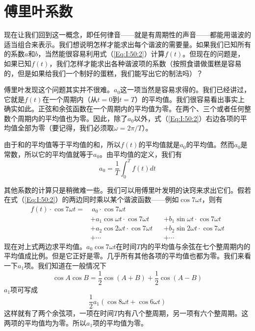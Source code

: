 \section{傅里叶系数}

现在让我们回到这一概念，即任何律音——就是有周期性的声音——都能用谐波的适当组合来表示。我们想说明怎样才能求出每个谐波的需要量。如果我们已知所有的系数$a$和$b$，当然能很容易利用式（\ref{Eq:I:50:2}）计算$f(t)$。但现在的问题是，如果已知$f(t)$，我们怎样才能求出各种谐波项的系数（按照食谱做蛋糕是容易的，但是如果给我们一个制好的蛋糕，我们能写出它的制法吗）？

傅里叶发现这个问题其实并不很难。$a_0$这一项当然是容易求得的。我们已经讲过，它就是$f(t)$在一个周期内（从$t=0$到$t=T$）的平均值。我们很容易看出事实上确实如此。正弦和余弦函数在一个周期内的平均值为零。在两个、三个或者任何整数个周期内的平均值也为零。因此，除了$a_0$以外，式（\ref{Eq:I:50:2}）右边各项的平均值全部为零（要记得，我们必须取$\omega=2\pi/T$）。

由于和的平均值等于平均值的和，所以$f(t)$的平均值就是$a_0$的平均值。然而$a_0$是常数，所以它的平均值就等于$a_0$。由平均值的定义，我们有
\begin{equation}
    \label{Eq:I:50:3}
    a_0 = \frac{1}{T}\int_0^T f(t)dt
\end{equation}

其他系数的计算只是稍微难一些。我们可以用傅里叶发明的诀窍来求出它们。假若在式（\ref{Eq:I:50:2}）的两边同时乘以某个谐波函数——例如$\cos7\omega t$，则有
\begin{equation}
    \label{Eq:I:50:4}
    \begin{aligned}
        f(t)\cdot\cos7\omega t = &~a_0\cdot\cos 7\omega t \\
        &+ a_1\cos\omega t\cdot \cos 7 \omega t &&+ b_1 \sin\omega t \cdot \cos 7 \omega t \\
        &+ a_2\cos2\omega t\cdot \cos 7 \omega t &&+ b_2 \sin2\omega t \cdot \cos 7 \omega t \\
        &+\cdots &&+ \cdots
    \end{aligned}
\end{equation}
现在对上式两边求平均值。$a_0\cos 7 \omega t$在时间$T$内的平均值与余弦在七个整周期内的平均值成比例。但是它正好是零。几乎所有其他各项的平均值也都为零。我们来看一下$a_1$项。我们知道在一般情况下
\begin{equation}
    \label{Eq:I:50:5}
    \cos A \cos B = \frac{1}{2}\cos(A+B) + \frac{1}{2}\cos(A-B)
\end{equation}
$a_1$项可写成
\begin{equation}
    \label{Eq:I:50:6}
    \frac{1}{2}a_1(\cos 8\omega t + \cos 6 \omega t)
\end{equation}
这样就有了两个余弦项，一项在时间$T$内有八个整周期，另一项有六个整周期。这两项的平均值均为零。所以$a_1$项的平均值为零。

